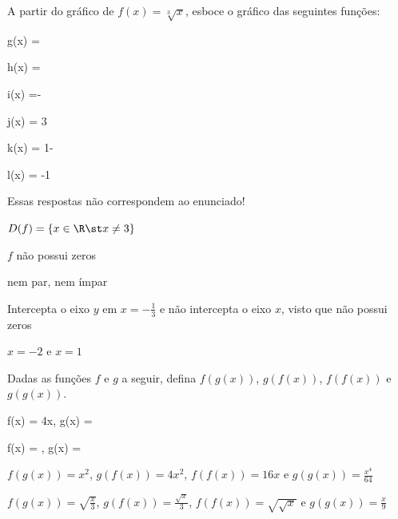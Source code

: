 \begin{exercises*}
\begin{exercise}
  A partir do gráfico de $f(x)=\sqrt[3]{x}$,
  esboce o gráfico das seguintes funções:
  \begin{mathlist}
    \item g(x) = 
    \item h(x) = 
    \item i(x) =-
    \item j(x) = 3
    \item k(x) = 1-
    \item l(x) = -1
  \end{mathlist}

  \begin{answer}
    {\large\color{red} Essas respostas não correspondem ao enunciado!}
    \begin{alphalist}
      \item $D(f)=\{ x \in \R \st x \neq 3\}$
      \item $f$ não possui zeros
      \item nem par, nem ímpar
      \item Intercepta o eixo $y$ em $x=-\frac{1}{3}$ e não intercepta o eixo $x$,
            visto que não possui zeros
      \item $x=-2$ e $x=1$
    \end{alphalist}
  \end{answer}
\end{exercise}

\begin{exercise}
  Dadas as funções $f$ e $g$ a seguir,
  defina $f(g(x))$, $g(f(x))$, $f(f(x))$ e $g(g(x))$.
  \begin{mathlist}
    \item f(x) = 4x,       \quad g(x) = 
    \item f(x) = , \quad g(x) = 
  \end{mathlist}

  \begin{answer}
    \begin{alphalist}
      \item $f(g(x))=x^2$,
            $g(f(x))=4x^2$,
            $f(f(x))=16x$ e
            $g(g(x))=\frac{x^4}{64}$
      \item $f(g(x))=\sqrt{\frac{x}{3}}$,
            $g(f(x))=\frac{\sqrt{x}}{3}$,
            $f(f(x))=\sqrt{\sqrt{x}}$ e
            $g(g(x))=\frac{x}{9}$
    \end{alphalist}
  \end{answer}
\end{exercise}


\end{exercises*}
